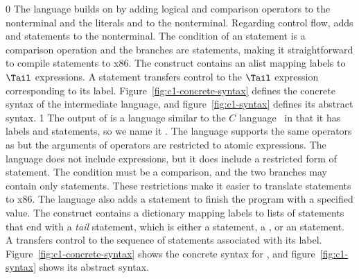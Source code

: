 \documentclass[7x10]{TimesAPriori_MIT}%
\def\racketEd{0}
\def\pythonEd{1}
\def\edition{1}
\newcommand{\pythonColor}[0]{}
\numberwithin{theorem}{chapter}
\numberwithin{definition}{chapter}
\numberwithin{equation}{chapter}
\begin{document}
{\if\edition\racketEd
%
The \LangCIf{} language builds on \LangCVar{} by adding logical and
comparison operators to the \Exp{} nonterminal and the literals
\TRUE{} and \FALSE{} to the \Arg{} nonterminal.  Regarding control
flow, \LangCIf{} adds  and  statements to the
\Tail{} nonterminal. The condition of an  statement is a
comparison operation and the branches are  statements,
making it straightforward to compile  statements to x86.  The
 construct contains an alist mapping labels to $\Tail$
expressions. A  statement transfers control to the $\Tail$
expression corresponding to its label.
%
Figure~\ref{fig:c1-concrete-syntax} defines the concrete syntax of the
\LangCIf{} intermediate language, and figure~\ref{fig:c1-syntax}
defines its abstract syntax.
%
\fi}
%
{\if\edition\pythonEd\pythonColor
%
The output of  is a language similar to the
$C$ language~\citep{Kernighan:1988nx} in that it has labels and
 statements, so we name it \LangCIf{}.  
%
The \LangCIf{} language supports the same operators as \LangIf{} but
the arguments of operators are restricted to atomic expressions. The
\LangCIf{} language does not include  expressions, but it does
include a restricted form of  statement. The condition must be
a comparison, and the two branches may contain only 
statements. These restrictions make it easier to translate 
statements to x86.  The \LangCIf{} language also adds a 
statement to finish the program with a specified value.
%
The  construct contains a dictionary mapping labels to
lists of statements that end with a \emph{tail} statement, which is
either a  statement, a , or an
 statement.
%
A  transfers control to the sequence of statements
associated with its label.
%
Figure~\ref{fig:c1-concrete-syntax} shows the concrete syntax for \LangCIf{},
and figure~\ref{fig:c1-syntax} shows its
abstract syntax.
%
\fi}
%

\newcommand{\CifGrammarRacket}{
\begin{array}{lcl}
\Atm &::=& \itm{bool} \\
\itm{cmp} &::= & \code{eq?} \MID \code{<} \MID \code{<=} \MID \code{>} \MID \code{>=} \\
\Exp &::=& \CNOT{\Atm} \MID \LP \itm{cmp}~\Atm~\Atm\RP \\
\Tail &::= & \key{goto}~\itm{label}\key{;}\\
   &\MID& \key{if}~\LP \itm{cmp}~\Atm~\Atm \RP~ \key{goto}~\itm{label}\key{;} ~\key{else}~\key{goto}~\itm{label}\key{;} 
\end{array}
}
\end{document}
